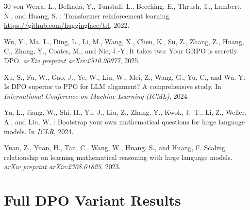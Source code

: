 \documentclass{article}
\begin{document}
\begin{thebibliography}{30}
von Werra, L., Belkada, Y., Tunstall, L., Beeching, E., Thrush, T., Lambert, N., and Huang, S.
: Transformer reinforcement learning.
\newblock \url{https://github.com/huggingface/trl}, 2022.

Wu, Y., Ma, L., Ding, L., Li, M., Wang, X., Chen, K., Su, Z., Zhang, Z., Huang, C., Zhang, Y., Coates, M., and Nie, J.-Y.
\newblock It takes two: Your {GRPO} is secretly {DPO}.
\newblock \emph{arXiv preprint arXiv:2510.00977}, 2025.

Xu, S., Fu, W., Gao, J., Ye, W., Liu, W., Mei, Z., Wang, G., Yu, C., and Wu, Y.
\newblock Is {DPO} superior to {PPO} for {LLM} alignment? {A} comprehensive study.
\newblock In \emph{International Conference on Machine Learning (ICML)}, 2024.

Yu, L., Jiang, W., Shi, H., Yu, J., Liu, Z., Zhang, Y., Kwok, J.~T., Li, Z., Weller, A., and Liu, W.
: Bootstrap your own mathematical questions for large language models.
\newblock In \emph{ICLR}, 2024.

Yuan, Z., Yuan, H., Tan, C., Wang, W., Huang, S., and Huang, F.
\newblock Scaling relationship on learning mathematical reasoning with large language models.
\newblock \emph{arXiv preprint arXiv:2308.01825}, 2023.

\end{thebibliography}

\appendix

\section{Full DPO Variant Results}
\label{app:dpo_full}
\end{document}
